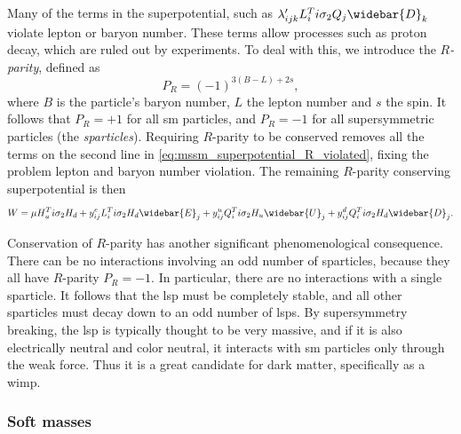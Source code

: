 Many of the terms in the superpotential, such as $\lambda_{ijk}' L_i^Ti\sigma_2Q_j\widebar{D}_k$ violate lepton or baryon number.
These terms allow processes such as proton decay, which are ruled out by experiments.
To deal with this, we introduce the \emph{$R$-parity}, defined as~\cite{Martin:1997ns} 
\begin{equation}
    P_R = (-1)^{3(B-L)+2s},
\end{equation}
where $B$ is the particle's baryon number, $L$ the lepton number and $s$ the spin.
It follows that $P_R=+1$ for all \gls{sm} particles, and $P_R=-1$ for all supersymmetric particles (the \emph{sparticles}).
Requiring $R$-parity to be conserved removes all the terms on the second line in \cref{eq:mssm_superpotential_R_violated}, fixing the problem lepton and baryon number violation.
The remaining $R$-parity conserving superpotential is then
\begin{equation}\label{eq:mssm_superpotential}
    W = \mu H_u^Ti\sigma_2H_d + y_{ij}^e L_i^Ti\sigma_2H_d\widebar{E}_j + y_{ij}^u Q_i^Ti\sigma_2H_u\widebar{U}_j + y_{ij}^d Q_i^Ti\sigma_2H_d\widebar{D}_j.
\end{equation}

Conservation of $R$-parity has another significant phenomenological consequence.
There can be no interactions involving an odd number of sparticles, because they all have $R$-parity $P_R=-1$. In particular, there are no interactions with a single sparticle.
It follows that the \gls{lsp} must be completely stable, and all other sparticles must decay down to an odd number of \glspl{lsp}.
By supersymmetry breaking, the \gls{lsp} is typically thought to be very massive, and if it is also electrically neutral and color neutral, it interacts with \gls{sm} particles only through the weak force.
Thus it is a great candidate for dark matter, specifically as a \gls{wimp}.


\subsubsection{Soft masses}

